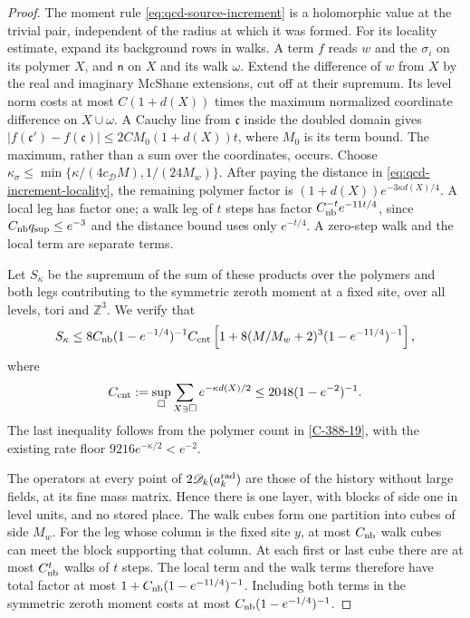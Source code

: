 \documentclass[11pt,letterpaper,reqno]{amsart}
\theoremstyle{definition}
\theoremstyle{remark}
\begin{document}
\begin{proof}
The moment rule \eqref{eq:qcd-source-increment} is a
holomorphic value at the trivial pair, independent of the
radius at which it was formed. For its locality estimate,
expand its background rows in walks. A term $f$ reads $w$
and the $\sigma_i$ on its polymer $X$, and $\mathsf n$ on
$X$ and its walk $\omega$. Extend the difference of $w$
from $X$ by the real and imaginary McShane extensions,
cut off at their supremum. Its level norm costs at most
$C(1+d(X))$ times the maximum normalized coordinate
difference on $X\cup\omega$. A Cauchy line from
$\mathfrak c$ inside the doubled domain gives
$|f(\mathfrak c')-f(\mathfrak c)|\le
2CM_0(1+d(X))t$, where $M_0$ is its term bound.
The maximum, rather than a sum over the coordinates, occurs.
Choose
$\kappa_\sigma\le\min\{\kappa/(4c_{\mathcal D}M),1/(24M_w)\}$.
After paying the distance in \eqref{eq:qcd-increment-locality},
the remaining polymer factor is
$(1+d(X))e^{-3\kappa d(X)/4}$. A local leg has factor one;
a walk leg of $t$ steps has factor
$C_{\rm nb}^{-t}e^{-11t/4}$, since
$C_{\rm nb}q_{\rm sup}\le e^{-3}$ and the distance bound
uses only $e^{-t/4}$. A zero-step walk and the local term
are separate terms.

Let $S_\kappa$ be the supremum of the sum of these products
over the polymers and both legs contributing to the symmetric
zeroth moment at a fixed site, over all levels, tori and
$\mathbb Z^3$. We verify that
\begin{equation}\label{eq:qcd-increment-count}
 S_\kappa\le
 8C_{\rm nb}(1-e^{-1/4})^{-1}C_{\rm cnt}
 \left[1+8(M/M_w+2)^3(1-e^{-11/4})^{-1}\right],
\end{equation}
where
\[
 C_{\rm cnt}:=\sup_\square\sum_{X\ni\square}
                          e^{-\kappa d(X)/2}
 \le2048(1-e^{-2})^{-1}.
\]
The last inequality follows from the polymer count in
\cref{C-388-19}, with the existing rate floor
$9216e^{-\kappa/2}<e^{-2}$.

The operators at every point of $2\mathscr D_k(a_k^{\rm rad})$
are those of the history without large fields, at its fine
mass matrix. Hence there is one layer, with blocks of side
one in level units, and no stored place. The walk cubes form
one partition into cubes of side $M_w$.
For the leg whose column is the fixed site $y$, at most
$C_{\rm nb}$ walk cubes can meet the block supporting that
column. At each first or last cube there are at most
$C_{\rm nb}^t$ walks of $t$ steps. The local term and the
walk terms therefore have total factor at most
$1+C_{\rm nb}(1-e^{-11/4})^{-1}$. Including both terms in
the symmetric zeroth moment costs at most
$C_{\rm nb}(1-e^{-1/4})^{-1}$.


\end{proof}
\end{document}
